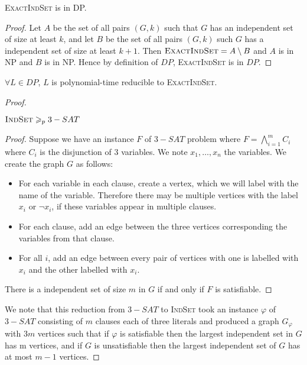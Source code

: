 \begin{propo}\label{3:1}
    \textsc{ExactIndSet} is in DP.
\end{propo}
\begin{proof}
    Let $A$ be the set of all pairs $(G, k)$ such that $G$ has an independent set of size at least $k$, and let $B$ be the set of all pairs $(G, k)$ such $G$ has a independent set of size at least $k+1$. Then $\textsc{ExactIndSet}=A \setminus B$ and $A$ is in NP and $B$ is in NP. Hence by definition of $DP$, \textsc{ExactIndSet} is in $DP$.
\end{proof}

\begin{propo}\label{3:2}
    $\forall L \in DP$, $L$ is polynomial-time reducible to \textsc{ExactIndSet}.
\end{propo}
\begin{proof}
    \begin{lemma}
        $\textsc{IndSet} \geqslant_p 3-SAT$
    \end{lemma}
    \begin{proof}
        Suppose we have an instance $F$ of $3-SAT$ problem where $F=\bigwedge\limits_{i=1}^m C_i$ where $C_i$ is the disjunction of 3 variables. We note $x_1,\ldots,x_n$ the variables. We create the graph $G$ as follows:
        \begin{itemize}
            \item For each variable in each clause, create a vertex, which we will label with the name of the variable. Therefore there may be multiple vertices with the label $x_i$ or $\neg x_i$, if these variables appear in multiple clauses.
            \item For each clause, add an edge between the three vertices corresponding the variables from that clause.
            \item For all $i$, add an edge between every pair of vertices with one is labelled with $x_i$ and the other labelled with $x_i$.
        \end{itemize}
        
        There is a independent set of size $m$ in $G$ if and only if $F$ is satisfiable.    
    \end{proof}
    
    We note that this reduction from $3-SAT$ to \textsc{IndSet} took an instance $\varphi$ of $3-SAT$ consisting of $m$ clauses each of three literals and produced a graph $G_\varphi$ with $3 m$ vertices such that if $\varphi$ is satisfiable then the largest independent set in $G$ has m vertices, and if $G$ is unsatisfiable then the largest independent set of $G$ has at most $m - 1$ vertices. 
    

\end{proof}
